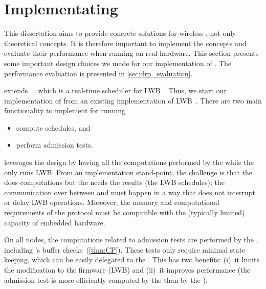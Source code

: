 
\section{Implementating \DRP}
\label{sec:drp_implementation}

This dissertation aims to provide concrete solutions for wireless \CPS, not only theoretical concepts. It is therefore important to implement the concepts and evaluate their performance when running on real hardware.
This section presents some important design choices we made for our implementation of \DRP.
%
The performance evaluation is presented in \cref{sec:drp_evaluation}.




\DRP extends \blink~\cite{zimmerling2017Blink}, which is a real-time scheduler for LWB~\cite{ferrari2012LWB}. Thus, we start our implementation of \DRP from an existing implementation of LWB~\cite{Code_LWB}. There are two main functionality to implement for running \DRP
\begin{itemize}[nosep]
  \item
compute \blink schedules, and
  \item
perform \DRP admission tests.
\end{itemize}

\DRP leverages the \DPP design by having all the computations performed by the \AP while the \CP only runs LWB.
From an implementation stand-point, the challenge is that the \AP does computations but the \CP needs the results (\eg the LWB schedules); the communication over \bolt between \AP and \CP  must happen in a way that does not interrupt or delay LWB operations.
Moreover, the memory and computational requirements of the protocol must be compatible with the (typically limited) capacity of embedded hardware.

On all nodes, the computations related to \DRP admission tests are performed by the \AP, including \CP's buffer checks~(\cref{thm:CP}).
These tests only require minimal state keeping, which can be easily delegated to the \AP. This has two benefits: (i)~it limits the modification to the \CP firmware (\ie LWB) and (ii)~it improves performance (the admission test is more efficiently computed by the \AP than by the \CP).

